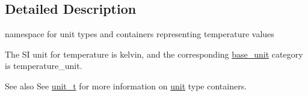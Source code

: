 \subsection{Detailed Description}
namespace for unit types and containers representing temperature values 

The S\+I unit for temperature is {\ttfamily kelvin}, and the corresponding {\ttfamily \hyperlink{structunits_1_1base__unit}{base\+\_\+unit}} category is {\ttfamily temperature\+\_\+unit}. \begin{DoxySeeAlso}{See also}
See \hyperlink{classunits_1_1unit__t}{unit\+\_\+t} for more information on \hyperlink{structunits_1_1unit}{unit} type containers. 
\end{DoxySeeAlso}
